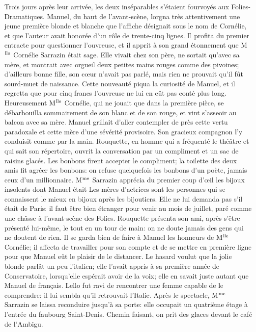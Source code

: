 Trois jours après leur arrivée, les deux inséparables s'étaient fourvoyés aux Folies-Dramatiques. Manuel, du haut de l'avant-scène, lorgna très attentivement une jeune première blonde et blanche que l'affiche désignait sous le nom de Cornélie, et que l'auteur avait honorée d'un rôle de trente-cinq lignes. Il profita du premier entracte pour questionner l'ouvreuse, et il apprit à son grand étonnement que M$\textsuperscript{lle}$ Cornélie Sarrazin était sage. Elle vivait chez son père, ne sortait qu'avec sa mère, et montrait avec orgueil deux petites mains rouges comme des pivoines; \textemdash{} d'ailleurs bonne fille, son c\oe{}ur n'avait pas parlé, mais rien ne prouvait qu'il fût sourd-muet de naissance. Cette nouveauté piqua la curiosité de Manuel, et il regretta que pour cinq francs l'ouvreuse ne lui en eût pas conté plus long. Heureusement M$\textsuperscript{lle}$ Cornélie, qui ne jouait que dans la première pièce, se débarbouilla sommairement de son blanc et de son rouge, et vint s'asseoir au balcon avec sa mère. Manuel grillait d'aller contempler de près cette vertu paradoxale et cette mère d'une sévérité provisoire. Son gracieux compagnon l'y conduisit comme par la main. Rouquette, en homme qui a fréquenté le théâtre et qui sait son répertoire, ouvrit la conversation par un compliment et un sac de raisins glacés. Les bonbons firent accepter le compliment; la toilette des deux amis fit agréer les bonbons: on refuse quelquefois les bonbons d'un poète, jamais ceux d'un millionnaire. M$\textsuperscript{me}$ Sarrazin apprécia du premier coup d'\oe{}il les bijoux insolents dont Manuel était Les mères d'actrices sont les personnes qui se connaissent le mieux en bijoux après les bijoutiers. Elle ne lui demanda pas s'il était de Paris: il faut être bien étranger pour venir au mois de juillet, paré comme une châsse à l'avant-scène des Folies. Rouquette présenta son ami, après s'être présenté lui-même, le tout en un tour de main: on ne doute jamais des gens qui ne doutent de rien. Il se garda bien de faire à Manuel les honneurs de M$\textsuperscript{lle}$ Cornélie; il affecta de travailler pour son compte et de se mettre en première ligne pour que Manuel eût le plaisir de le distancer. Le hasard voulut que la jolie blonde parlât un peu l'italien; elle l'avait appris à sa première année de Conservatoire, lorsqu'elle espérait avoir de la voix; elle en savait juste autant que Manuel de français. Lello fut ravi de rencontrer une femme capable de le comprendre: il lui sembla qu'il retrouvait l'Italie. Après le spectacle, M$\textsuperscript{me}$ Sarrazin se laissa reconduire jusqu'à sa porte: elle occupait un quatrième étage à l'entrée du faubourg Saint-Denis. Chemin faisant, on prit des glaces devant le café de l'Ambigu.

